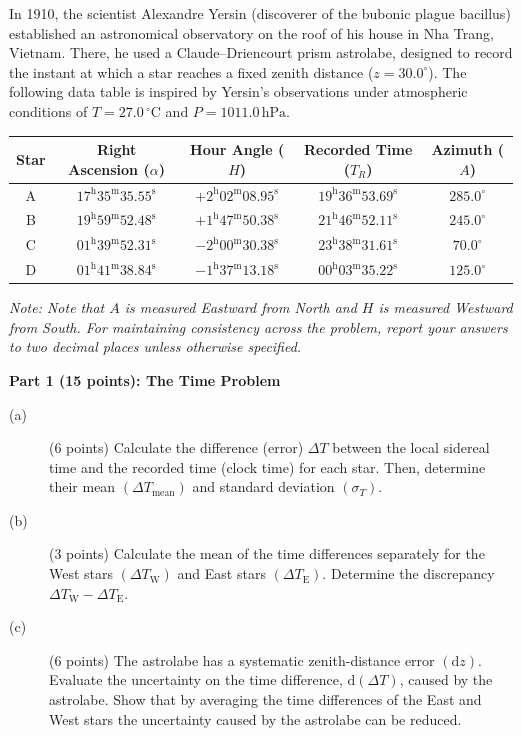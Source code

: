 In 1910, the scientist Alexandre Yersin (discoverer of the bubonic plague
bacillus) established an astronomical observatory on the roof of his house in
Nha Trang, Vietnam. There, he used a Claude--Driencourt prism astrolabe,
designed to record the instant at which a star reaches a fixed zenith distance
($z = 30.0^\circ$). The following data table is inspired by Yersin's
observations under atmospheric conditions of $T = 27.0\,^\circ\mathrm{C}$ and
$P = 1011.0\,\mathrm{hPa}$.

\begin{center}
\begin{tabular}{ccccc}
\toprule
Star & Right Ascension ($\alpha$) & Hour Angle ($H$) & Recorded Time ($T_R$) & Azimuth ($A$) \\
\midrule
A & $17^{\mathrm{h}}35^{\mathrm{m}}35.55^{\mathrm{s}}$ & $+2^{\mathrm{h}}02^{\mathrm{m}}08.95^{\mathrm{s}}$ & $19^{\mathrm{h}}36^{\mathrm{m}}53.69^{\mathrm{s}}$ & $285.0^\circ$ \\
B & $19^{\mathrm{h}}59^{\mathrm{m}}52.48^{\mathrm{s}}$ & $+1^{\mathrm{h}}47^{\mathrm{m}}50.38^{\mathrm{s}}$ & $21^{\mathrm{h}}46^{\mathrm{m}}52.11^{\mathrm{s}}$ & $245.0^\circ$ \\
C & $01^{\mathrm{h}}39^{\mathrm{m}}52.31^{\mathrm{s}}$ & $-2^{\mathrm{h}}00^{\mathrm{m}}30.38^{\mathrm{s}}$ & $23^{\mathrm{h}}38^{\mathrm{m}}31.61^{\mathrm{s}}$ & $70.0^\circ$ \\
D & $01^{\mathrm{h}}41^{\mathrm{m}}38.84^{\mathrm{s}}$ & $-1^{\mathrm{h}}37^{\mathrm{m}}13.18^{\mathrm{s}}$ & $00^{\mathrm{h}}03^{\mathrm{m}}35.22^{\mathrm{s}}$ & $125.0^\circ$ \\
\bottomrule
\end{tabular}
\end{center}

\emph{Note: Note that $A$ is measured Eastward from North and $H$ is measured
Westward from South. For maintaining consistency across the problem, report
your answers to two decimal places unless otherwise specified.}

\medskip\noindent\textbf{Part 1 (15 points): The Time Problem}

\begin{description}
\item[(a)] (6 points) Calculate the difference (error) $\Delta T$ between the
  local sidereal time and the recorded time (clock time) for each star. Then,
  determine their mean $(\Delta T_{\mathrm{mean}})$ and standard deviation
  $(\sigma_T)$.
\item[(b)] (3 points) Calculate the mean of the time differences separately
  for the West stars $(\Delta T_{\mathrm{W}})$ and East stars
  $(\Delta T_{\mathrm{E}})$. Determine the discrepancy
  $\Delta T_{\mathrm{W}} - \Delta T_{\mathrm{E}}$.
\item[(c)] (6 points) The astrolabe has a systematic zenith-distance error
  $(\mathrm{d}z)$. Evaluate the uncertainty on the time difference,
  $\mathrm{d}(\Delta T)$, caused by the astrolabe. Show that by averaging the
  time differences of the East and West stars the uncertainty caused by the
  astrolabe can be reduced.
\end{description}

